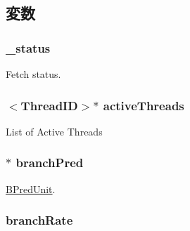 \subsection{変数}
\hypertarget{classDefaultFetch_aa3fc43283eb7a93d6a41830bbd412681}{
\subsubsection[{\_\-status}]{ {\bf \_\-status}}}
\label{classDefaultFetch_aa3fc43283eb7a93d6a41830bbd412681}
Fetch status. \hypertarget{classDefaultFetch_af6eaea53db532812052f71bf0380dab5}{
\subsubsection[{activeThreads}]{$<${\bf ThreadID}$>$$\ast$ {\bf activeThreads}}}
\label{classDefaultFetch_af6eaea53db532812052f71bf0380dab5}
List of Active Threads \hypertarget{classDefaultFetch_adee29d0de843b42df1f1caf92d388413}{
\subsubsection[{branchPred}]{$\ast$ {\bf branchPred}}}
\label{classDefaultFetch_adee29d0de843b42df1f1caf92d388413}
\hyperlink{classBPredUnit}{BPredUnit}. \hypertarget{classDefaultFetch_abceba4006d416e352df47f692b589bc3}{
\subsubsection[{branchRate}]{ {\bf branchRate}}}
